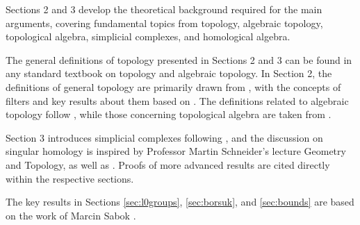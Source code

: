 Sections 2 and 3 develop the theoretical background required for the main arguments, covering fundamental topics from topology, algebraic topology, topological algebra, simplicial complexes, and homological algebra.

The general definitions of topology presented in Sections 2 and 3 can be found in any standard textbook on topology and algebraic topology. In Section 2, the definitions of general topology are primarily drawn from \cite{MunTop}, with the concepts of filters and key results about them based on \cite{BvQMT}. The definitions related to algebraic topology follow \cite{MunAlTop}, while those concerning topological algebra are taken from \cite{atop2008}.

Section 3 introduces simplicial complexes following \cite{MunAlTop}, and the discussion on singular homology is inspired by Professor Martin Schneider’s lecture Geometry and Topology, as well as \cite{hatcher}. Proofs of more advanced results are cited directly within the respective sections.

The key results in Sections \ref{sec:l0groups}, \ref{sec:borsuk}, and \ref{sec:bounds} are based on the work of Marcin Sabok \cite{sabok2012}.
